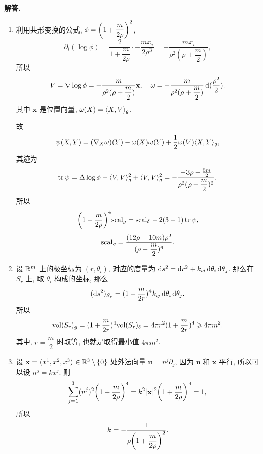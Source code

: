 \documentclass{ctexart}
\newenvironment{solution}{\par\noindent\textbf{解答. }}{\par}
\begin{document}
\begin{solution}
    \begin{enumerate}
        \item 利用共形变换的公式, $ \phi = \biggl( 1 + \dfrac{m}{2 \rho}\biggr)^2 $,
        \[
            \partial_i(\log \phi) = \dfrac{2}{1 + \dfrac{m}{2\rho}} \cdot -\dfrac{mx_i}{2\rho^3} = -\dfrac{mx_i}{\rho^2 (\rho + \dfrac{m}{2})},
        \]
        所以
        \[
            V = \nabla \log \phi = -\dfrac{m}{\rho^2 (\rho + \dfrac{m}{2})}\mathbf{x}, \quad \omega = -\dfrac{m}{\rho^2 (\rho + \dfrac{m}{2})}\mathop{}\!\mathrm{d} (\dfrac{\rho^2}{2}).
        \]
        其中 $\mathbf{x}$ 是位置向量, $\omega(X) = \langle {X}, {V} \rangle_{g}$.

        故
        \[
            \psi(X, Y) = (\nabla_{X}\omega)(Y) - \omega(X)\omega(Y) + \dfrac{1}{2}\omega(V)\langle {X}, {Y} \rangle_{g},
        \]
        其迹为
        \[
            \operatorname{tr} \psi = \Delta \log \phi - \langle {V}, {V} \rangle^2_{g} + \langle {V}, {V} \rangle^2_{g} = -\dfrac{ -3\rho - \frac{5m}{2} }{ \rho^2 (\rho + \dfrac{ m }{ 2 })^2 }.
        \]
        所以
        \[
            \biggl( 1 + \dfrac{m}{2 \rho}\biggr)^4 \mathrm{scal}_g = \mathrm{scal}_{\delta} - 2(3 - 1) \operatorname{tr} \psi,
        \]
        \[
            \mathrm{scal}_{g} = \dfrac{ (12 \rho + 10 m) \rho^2 }{ (\rho + \dfrac{ m }{ 2 })^6 }.
        \]
        \item 设 $\mathbb{R}^m$ 上的极坐标为 $(r, \theta_i)$, 对应的度量为 $\mathop{}\!\mathrm{d} s^2 = \mathop{}\!\mathrm{d} r^2 + k_{ij}\mathop{}\!\mathrm{d} \theta_i \mathop{}\!\mathrm{d} \theta_j$. 那么在 $S_r$ 上, 取 $\theta_i$ 构成的坐标, 那么
        \[
            (\mathop{}\!\mathrm{d} s^2)_{S_r} = (1 + \frac{m}{2r})^4 k_{ij} \mathop{}\!\mathrm{d} \theta_i \mathop{}\!\mathrm{d} \theta_j.
        \]
        所以
        \[
            \mathrm{vol}(S_r)_{g} = (1 + \frac{m}{2r})^4 \mathrm{vol}(S_r)_{\delta} = 4 \pi r^2 (1 + \frac{m}{2r})^4 \geqslant 4\pi m^2 .
        \]
        其中, $r = \dfrac{m}{2}$ 时取等, 也就是取得最小值 $4\pi m^2 $.
        \item 设 $\mathbf{x} = (x^1, x^2, x^3) \in \mathbb{R}^3 \setminus \{0\}$ 处外法向量 $\mathbf{n} = n^j\partial_j$, 因为 $\mathbf{n}$ 和 $\mathbf{x}$ 平行, 所以可以设 $n^j = kx^j$. 则
        \[
            \sum_{j = 1}^{3} (n^j)^2\biggl( 1 + \dfrac{m}{2 \rho}\biggr)^4 = k^2|\mathbf{x}|^2\biggl( 1 + \dfrac{m}{2 \rho}\biggr)^4 = 1,
        \]
        所以
        \[
            k = -\dfrac{1}{\rho \biggl( 1 + \dfrac{m}{2 \rho}\biggr)^2}.
        \]


\end{enumerate}
\end{solution}
\end{document}
